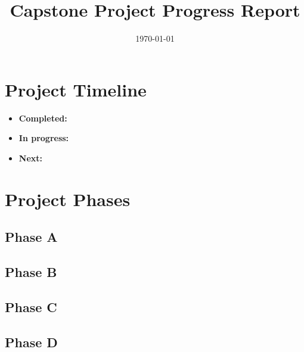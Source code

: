 \documentclass[12pt,a4paper]{article}
\title{Capstone Project Progress Report}
\author{}
\date{\today}
\begin{document}
\maketitle


\section{Project Timeline}
\label{sec:project-timeline}

\begin{itemize}
	\item \textbf{Completed:} %
	\item \textbf{In progress:} %
	\item \textbf{Next:} %
\end{itemize}

\section{Project Phases}
\label{sec:project-phases}

\subsection{Phase A}


\subsection{Phase B}

\subsection{Phase C}

\subsection{Phase D}
\end{document}
